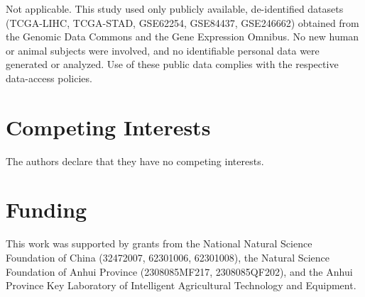 \documentclass[modern,large,numbered,nocrop]{oup-authoring-template}
\begin{document}
Not applicable. This study used only publicly available, de-identified datasets (TCGA-LIHC, TCGA-STAD, GSE62254, GSE84437, GSE246662) obtained from the Genomic Data Commons and the Gene Expression Omnibus. No new human or animal subjects were involved, and no identifiable personal data were generated or analyzed. Use of these public data complies with the respective data-access policies.

\section*{Competing Interests}

The authors declare that they have no competing interests.

\section*{Funding}

This work was supported by grants from the National Natural Science Foundation of China (32472007, 62301006, 62301008), the Natural Science Foundation of Anhui Province (2308085MF217, 2308085QF202), and the Anhui Province Key Laboratory of Intelligent Agricultural Technology and Equipment.
\end{document}
